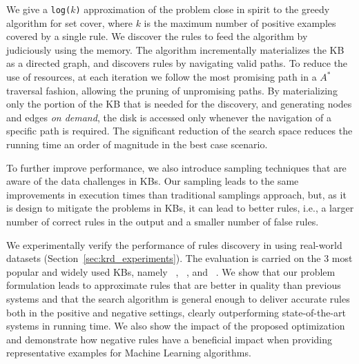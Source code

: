 We give a \texttt{log($k$)} approximation of the problem close in spirit to the greedy algorithm for set cover, where $k$ is the maximum number of positive examples covered by a single rule. We discover the rules to feed the algorithm by judiciously using the memory. The algorithm incrementally 
%
materializes the KB as a directed graph, and discovers rules by navigating valid paths. To reduce the use of resources, at each iteration we follow the most promising path in a $A^*$ traversal fashion, allowing the pruning of unpromising paths.	
By materializing only the portion of the KB that is needed for the discovery, and generating nodes and edges \emph{on demand}, the disk is accessed only whenever the navigation of a specific path is required. 
The significant reduction of the search space reduces the running time an order of magnitude in the best case scenario. 

To further improve performance, we also introduce sampling techniques that are aware of the data challenges in KBs. Our sampling leads to the same improvements in execution times than traditional samplings approach, but, as it is design to mitigate the problems in KBs, it can lead to better rules, i.e., a larger number of correct rules in the output and a smaller number of false rules.


\vspace{1ex}
We experimentally verify the performance of rules discovery in \krd using real-world datasets (Section~\ref{sec:krd_experiments}). The evaluation is carried on the 3 most popular and widely used KBs, namely \dbpedia~\cite{bizer2009dbpedia}, \yago~\cite{suchanek2007yago}, and \wikidata~\cite{vrandevcic2014wikidata}. 
We show that our problem formulation leads to approximate rules that are better in quality than previous systems and that the search algorithm is general enough to deliver accurate rules both in the positive and negative settings, clearly outperforming state-of-the-art systems in running time. We also show the impact of the proposed optimization and demonstrate how negative rules have a beneficial impact when providing representative examples for Machine Learning algorithms.

